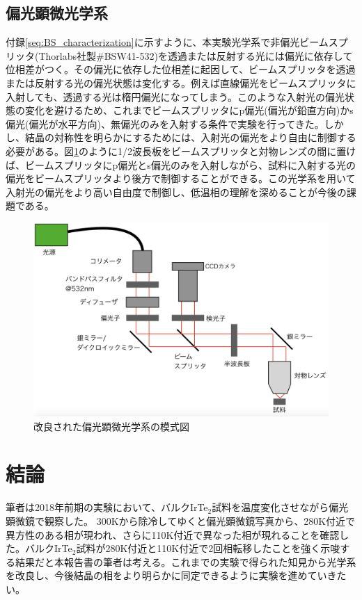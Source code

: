 \documentclass[11pt,a4paper]{jsarticle}
\begin{document}
\subsection{偏光顕微光学系}
付録\ref{seq:BS_characterization}に示すように、本実験光学系で非偏光ビームスプリッタ(Thorlabs社製\#BSW41-532)を透過または反射する光には偏光に依存して位相差がつく。その偏光に依存した位相差に起因して、ビームスプリッタを透過または反射する光の偏光状態は変化する。例えば直線偏光をビームスプリッタに入射しても、透過する光は楕円偏光になってしまう。このような入射光の偏光状態の変化を避けるため、これまでビームスプリッタにp偏光(偏光が鉛直方向)かs偏光(偏光が水平方向)、無偏光のみを入射する条件で実験を行ってきた。しかし、結晶の対称性を明らかにするためには、入射光の偏光をより自由に制御する必要がある。図\ref{fig:microscope2}のように1/2波長板をビームスプリッタと対物レンズの間に置けば、ビームスプリッタにp偏光とs偏光のみを入射しながら、試料に入射する光の偏光をビームスプリッタより後方で制御することができる。この光学系を用いて入射光の偏光をより高い自由度で制御し、低温相の理解を深めることが今後の課題である。
\begin{figure}[p]
  \begin{center}
   \includegraphics[width=120mm]{microscope2.eps}
  \end{center}
  \caption{改良された偏光顕微光学系の模式図}
  \label{fig:microscope2}
\end{figure}



\section{結論}
筆者は2018年前期の実験において、バルクIrTe$_2$試料を温度変化させながら偏光顕微鏡で観察した。
300Kから除冷してゆくと偏光顕微鏡写真から、280K付近で異方性のある相が現われ、さらに110K付近で異なった相が現れることを確認した。バルクIrTe$_2$試料が280K付近と110K付近で2回相転移したことを強く示唆する結果だと本報告書の筆者は考える。これまでの実験で得られた知見から光学系を改良し、今後結晶の相をより明らかに同定できるように実験を進めていきたい。
\end{document}
